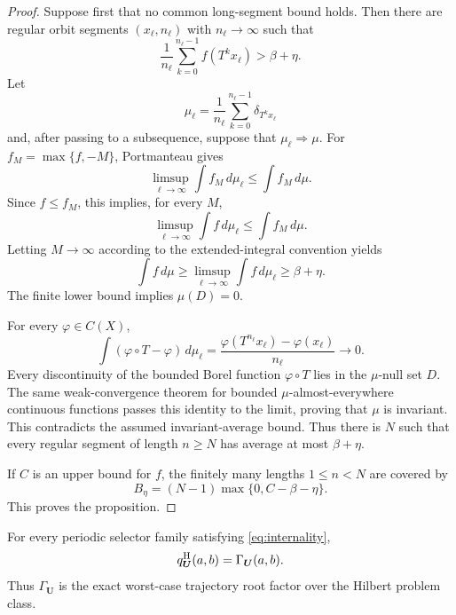 \documentclass[letterpaper,twoside]{article}
\begin{document}
\begin{proof}
Suppose first that no common long-segment bound holds.  Then there are regular
orbit segments $(x_\ell,n_\ell)$ with $n_\ell\to\infty$ such that
\[
 \frac1{n_\ell}\sum_{k=0}^{n_\ell-1}f(T^kx_\ell)
 >\beta+\eta.
\]
Let
\[
 \mu_\ell=\frac1{n_\ell}
 \sum_{k=0}^{n_\ell-1}\delta_{T^kx_\ell}
\]
and, after passing to a subsequence, suppose that $\mu_\ell\Rightarrow\mu$.
For $f_M=\max\{f,-M\}$, Portmanteau gives
\[
 \limsup_{\ell\to\infty}\int f_M\,d\mu_\ell
 \le\int f_M\,d\mu.
\]
Since $f\le f_M$, this implies, for every $M$,
\[
 \limsup_{\ell\to\infty}\int f\,d\mu_\ell
 \le\int f_M\,d\mu.
\]
Letting $M\to\infty$ according to the extended-integral convention yields
\[
 \int f\,d\mu
 \ge\limsup_{\ell\to\infty}\int f\,d\mu_\ell
 \ge\beta+\eta.
\]
The finite lower bound implies $\mu(D)=0$.

For every $\varphi\in C(X)$,
\[
 \int(\varphi\circ T-\varphi)\,d\mu_\ell
 =\frac{\varphi(T^{n_\ell}x_\ell)-\varphi(x_\ell)}{n_\ell}
 \longrightarrow0.
\]
Every discontinuity of the bounded Borel function $\varphi\circ T$ lies in
the $\mu$-null set $D$.  The same weak-convergence theorem for bounded
$\mu$-almost-everywhere continuous functions
\cite[Sec.~2]{Billingsley1999} passes this identity to the limit, proving that
$\mu$ is invariant.  This contradicts the assumed
invariant-average bound.  Thus there is $N$ such that every regular segment
of length $n\ge N$ has average at most $\beta+\eta$.

If $C$ is an upper bound for $f$, the finitely many lengths $1\le n<N$ are
covered by
\[
 B_\eta=(N-1)\max\{0,C-\beta-\eta\}.
\]
This proves the proposition.
\end{proof}

\begin{theorem}
\label{thm:gamma-realization}
For every periodic selector family satisfying \eqref{eq:internality},
\begin{equation}\label{eq:gamma-algorithmic}
 q^{\rm H}_{\bm U}(a,b)=\Gamma_{\bm U}(a,b).
\end{equation}
Thus $\Gamma_{\bm U}$ is the exact worst-case trajectory root factor over the
Hilbert problem class.
\end{theorem}
\end{document}
